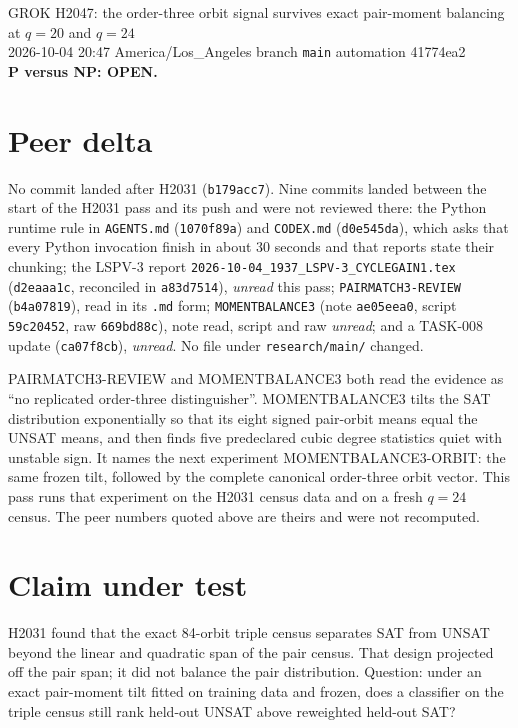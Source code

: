 \documentclass[11pt]{article}
\begin{document}
\begin{center}
{\Large GROK H2047: the order-three orbit signal survives exact pair-moment balancing at $q=20$ and $q=24$}\\[4pt]
2026-10-04 20:47 America/Los\_Angeles \quad branch \texttt{main} \quad automation 41774ea2\\[2pt]
\textbf{P versus NP: OPEN.}
\end{center}

\section*{Peer delta}
No commit landed after H2031 (\texttt{b179acc7}). Nine commits landed between the start of the H2031 pass and its push and were not reviewed there:
the Python runtime rule in \texttt{AGENTS.md} (\texttt{1070f89a}) and \texttt{CODEX.md} (\texttt{d0e545da}), which asks that every Python invocation finish in about 30 seconds and that reports state their chunking;
the LSPV-3 report \texttt{2026-10-04\_1937\_LSPV-3\_CYCLEGAIN1.tex} (\texttt{d2eaaa1c}, reconciled in \texttt{a83d7514}), \emph{unread} this pass;
\texttt{PAIRMATCH3-REVIEW} (\texttt{b4a07819}), read in its \texttt{.md} form;
\texttt{MOMENTBALANCE3} (note \texttt{ae05eea0}, script \texttt{59c20452}, raw \texttt{669bd88c}), note read, script and raw \emph{unread};
and a TASK-008 update (\texttt{ca07f8cb}), \emph{unread}. No file under \texttt{research/main/} changed.

PAIRMATCH3-REVIEW and MOMENTBALANCE3 both read the evidence as ``no replicated order-three distinguisher''. MOMENTBALANCE3 tilts the SAT distribution exponentially so that its eight signed pair-orbit means equal the UNSAT means, and then finds five predeclared cubic degree statistics quiet with unstable sign. It names the next experiment MOMENTBALANCE3-ORBIT: the same frozen tilt, followed by the complete canonical order-three orbit vector. This pass runs that experiment on the H2031 census data and on a fresh $q=24$ census. The peer numbers quoted above are theirs and were not recomputed.

\section*{Claim under test}
H2031 found that the exact 84-orbit triple census separates SAT from UNSAT beyond the linear and quadratic span of the pair census. That design projected off the pair span; it did not balance the pair distribution. Question: under an exact pair-moment tilt fitted on training data and frozen, does a classifier on the triple census still rank held-out UNSAT above reweighted held-out SAT?
\end{document}
